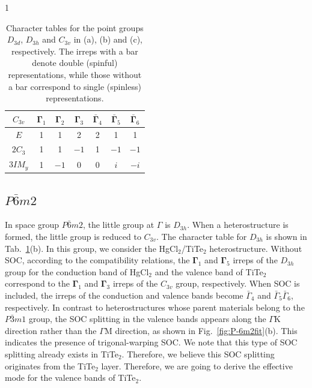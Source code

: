 \documentclass[aps, preprint, prb,]{revtex4-2}
\begin{document}
\begin{table}[h]
\begin{subtable}{1\textwidth}
\centering

\renewcommand{\arraystretch}{1.2}
\begin{tabular}{|c|c|c|c|c|c|c|}
\hline
$C_{3v}$ & $\mathbf{\Gamma}_1$ & $\mathbf{\Gamma}_2$ & $\mathbf{\Gamma}_3$ & $\bar{\mathbf{\Gamma}}_4$ & $\bar{\mathbf{\Gamma}}_5$ & $\bar{\mathbf{\Gamma}}_6$ \\
\hline
$E$ & 1 & 1 & 2 & 2 & 1 & 1 \\
$2C_3$ & 1 & 1 & $-1$ & 1 & $-1$ & $-1$ \\
$3IM_y$ & 1 & $-1$ & 0 & 0 & $i$ & $-i$ \\
\hline
\end{tabular}

\caption{\centering   }


\end{subtable}
\hfill
\caption { \justifying Character tables for the point groups $D_{3d}$, $D_{3h}$ and $C_{3v}$ in (a), (b) and (c), respectively. The irreps with a bar denote double (spinful) representations, while those without a bar correspond to single (spinless) representations.}
\label{Tab:charter table D3d c3v}
\end{table}
\subsection{$P\bar{6}m2$} \label{Sec: P6m2}
In space group $P\bar{6}m2$, the little group at $\Gamma$ is $D_{3h}$. When a heterostructure is formed, the little group is reduced to $C_{3v}$. The character table for $D_{3h}$ is shown in Tab.~\ref{Tab:charter table D3d c3v}(b). In this group, we consider the HgCl$_2$/TiTe$_2$ heterostructure. Without SOC, according to the compatibility relations, the $\mathbf{\Gamma}_1$ and $\mathbf{\Gamma}_5$ irreps of the $D_{3h}$ group for the conduction band of HgCl$_2$ and the valence band of TiTe$_2$ correspond to the $\mathbf{\Gamma}_1$ and $\mathbf{\Gamma}_3$ irreps of the $C_{3v}$ group, respectively. When SOC is included, the irreps of the conduction and valence bands become $\bar{\Gamma}_4$ and $\bar{\Gamma}_5\bar{\Gamma}_6$, respectively. In contrast to heterostructures whose parent materials belong to the $P\bar{3}m1$ group, the SOC splitting in the valence bands appears along the $\Gamma \text{K}$ direction rather than the $\Gamma \text{M}$ direction, as shown in Fig.~\ref{fig:P-6m2fit}(b). This indicates the presence of trigonal-warping SOC. We note that this type of SOC splitting already exists in TiTe$_2$. Therefore, we believe this SOC splitting originates from the TiTe$_2$ layer. Therefore, we are going to derive the effective mode for the valence bands of TiTe$_2$.
\end{document}

